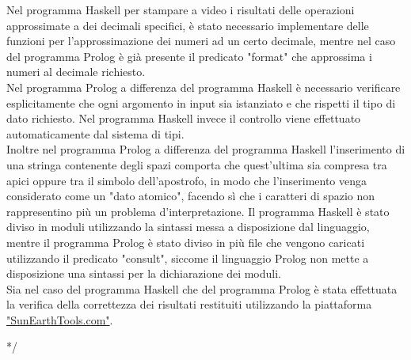 \documentclass{article}
\begin{document}
Nel programma Haskell per stampare a video i risultati delle operazioni approssimate a dei decimali specifici, è stato necessario implementare delle funzioni per l'approssimazione dei numeri ad un certo decimale, mentre nel caso del programma Prolog è già presente il predicato "format" che approssima i numeri al decimale richiesto.\\
%

Nel programma Prolog a differenza del programma Haskell è necessario verificare esplicitamente che ogni argomento in input sia istanziato e che rispetti il tipo di dato richiesto. Nel programma Haskell invece il controllo viene effettuato automaticamente dal sistema di tipi.\\
Inoltre nel programma Prolog a differenza del programma Haskell l'inserimento di una stringa contenente degli spazi comporta che quest'ultima sia compresa tra apici oppure tra il simbolo dell'apostrofo, in modo che l'inserimento venga considerato come un "dato atomico",  facendo sì che i caratteri di spazio non rappresentino più un problema d'interpretazione.
Il programma Haskell è stato diviso in moduli utilizzando la sintassi messa a disposizione dal linguaggio, mentre il programma Prolog è stato diviso in più file che vengono caricati utilizzando il predicato "consult", siccome il linguaggio Prolog non mette a disposizione una sintassi per la dichiarazione dei moduli.\\
Sia nel caso del programma Haskell che del programma Prolog è stata effettuata la verifica della correttezza dei risultati restituiti utilizzando la piattaforma \href{https://www.sunearthtools.com/it/tools/distance.php}{"SunEarthTools.com"}.

*/
\end{document}
